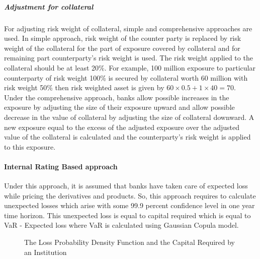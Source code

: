 \documentclass[11pt]{article}
\numberwithin{equation}{section}
\begin{document}
\subparagraph{Adjustment for collateral}\mbox{} \medskip

\hspace{1cm}For adjusting risk weight of collateral, simple and comprehensive approaches are used. In simple approach, risk weight of the counter party is replaced by risk weight of the collateral for the part of exposure covered by collateral and for remaining part counterparty's risk weight is used. The risk weight applied to the collateral should be at least 20\%. For example, 100 million exposure to particular counterparty of risk weight 100\% is secured by collateral worth 60 million with risk weight 50\% then risk weighted asset is given by $ 60\times0.5+1\times40=70 $.\\
\hspace{1 cm} Under the comprehensive approach, banks allow  possible increases in the exposure by adjusting the size of their exposure upward and allow possible decrease in the value of collateral by adjusting the size of collateral downward. A new exposure equal to the excess of the adjusted exposure over the adjusted value of the collateral is calculated
and the counterparty’s risk weight is applied to this exposure.    

\paragraph{Internal Rating Based approach}\mbox{} \medskip

\hspace{0.5cm}Under this approach, it is assumed that banks have taken care of expected loss while pricing the derivatives and products. So, this approach requires to calculate unexpected losses which arise with some 99.9 percent confidence level in one year time horizon. This unexpected loss is equal to capital required which is equal to VaR - Expected loss where VaR is calculated using Gaussian Copula model.

\begin{figure}[H]
\begin{center}
		\centering
		\caption{The Loss Probability Density Function and the Capital Required by an Institution}
		\label{fig:q1_f1_a}
\end{center}
\end{figure} 
\end{document}
